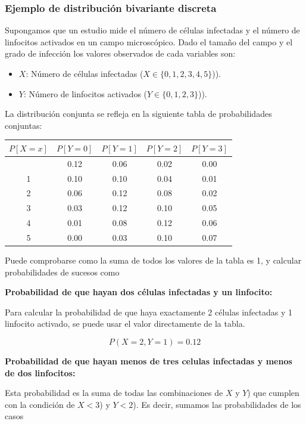 \documentclass[
]{article}
\providecommand{\tightlist}{%
  \setlength{\itemsep}{0pt}\setlength{\parskip}{0pt}}
\begin{document}
\subsubsection{Ejemplo de distribución bivariante discreta}\label{ejemplo-de-distribuciuxf3n-bivariante-discreta}

Supongamos que un estudio mide el número de células infectadas y el número de linfocitos activados en un campo microscópico. Dado el tamaño del campo y el grado de infección los valores observados de cada variables son:

\begin{itemize}
\tightlist
\item
  \(X\): Número de células infectadas (\(X \in \{0, 1, 2, 3, 4, 5\}\))).
\item
  \(Y\): Número de linfocitos activados (\(Y \in \{0, 1, 2, 3\}\))).
\end{itemize}

La distribución conjunta se refleja en la siguiente tabla de probabilidades conjuntas:

\begin{longtable}[]{@{}ccccc@{}}
\toprule\noalign{}
\(P[X=x]\) & \(P[Y = 0]\) & \(P[Y = 1]\) & \(P[Y = 2]\) & \(P[Y = 3]\) \\
\midrule\noalign{}
\endhead
\bottomrule\noalign{}
\endlastfoot
0 & 0.12 & 0.06 & 0.02 & 0.00 \\
1 & 0.10 & 0.10 & 0.04 & 0.01 \\
2 & 0.06 & 0.12 & 0.08 & 0.02 \\
3 & 0.03 & 0.12 & 0.10 & 0.05 \\
4 & 0.01 & 0.08 & 0.12 & 0.06 \\
5 & 0.00 & 0.03 & 0.10 & 0.07 \\
\end{longtable}

Puede comprobarse como la suma de todos los valores de la tabla es 1, y calcular probabilidades de sucesos como

\textbf{Probabilidad de que hayan dos células infectadas y un linfocito:}

Para calcular la probabilidad de que haya exactamente 2 células infectadas y 1 linfocito activado, se puede usar el valor directamente de la tabla.

\[
P(X = 2, Y = 1) = 0.12
\]

\textbf{Probabilidad de que hayan menos de tres celulas infectadas y menos de dos linfocitos:}

Esta probabilidad es la suma de todas las combinaciones de \(X\) y \(Y\)) que cumplen con la condición de \(X < 3\)) y \(Y < 2\)). Es decir, sumamos las probabilidades de los casos
\end{document}
